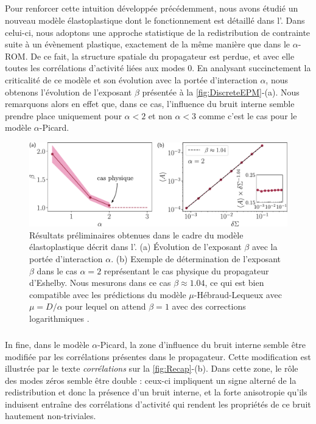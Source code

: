 \subparagraph{}Pour renforcer cette intuition développée précédemment, nous avons étudié un nouveau modèle élastoplastique dont le fonctionnement est détaillé dans l'. Dans celui-ci, nous adoptons une approche statistique de la redistribution de contrainte suite à un évènement plastique, exactement de la même manière que dans le $\alpha$-ROM. De ce fait, la structure spatiale du propagateur est perdue, et avec elle toutes les corrélations d'activité liées aux modes 0. En analysant succinctement la criticalité de ce modèle et son évolution avec la portée d’interaction $\alpha$, nous obtenons l'évolution de l'exposant $\beta$ présentée à la \autoref{fig:DiscreteEPM}-(a). Nous remarquons alors en effet que, dans ce cas, l'influence du bruit interne semble prendre place uniquement pour $\alpha < 2$ et non $\alpha < 3$ comme c'est le cas pour le modèle $\alpha$-Picard.

\begin{figure}[h]
	\centering
	\includegraphics[width=\textwidth]{Chapitre5/Figures/DiscreteEPM.pdf}
	\caption{Résultats préliminaires obtenues dans le cadre du modèle élastoplastique décrit dans l'. (a) Évolution de l'exposant $\beta$ avec la portée d'interaction $\alpha$. (b) Exemple de détermination de l'exposant $\beta$ dans le cas $\alpha = 2$ représentant le cas physique du propagateur d'Eshelby. Nous mesurons dans ce cas $\beta \approx 1.04$, ce qui est bien compatible avec les prédictions du modèle $\mu$-Hébraud-Lequeux avec $\mu = D/\alpha$ pour lequel on attend $\beta = 1$ avec des corrections logarithmiques \cite{lin_microscopic_2018}.}
	\label{fig:DiscreteEPM}
\end{figure}

\subparagraph{}In fine, dans le modèle $\alpha$-Picard, la zone d'influence du bruit interne semble être modifiée par les corrélations présentes dans le propagateur. Cette modification est illustrée par le texte \textit{corrélations} sur la \autoref{fig:Recap}-(b). Dans cette zone, le rôle des modes zéros semble être double : ceux-ci impliquent un signe alterné de la redistribution et donc la présence d'un bruit interne, et la forte anisotropie qu'ils induisent entraîne des corrélations d'activité qui rendent les propriétés de ce bruit hautement non-triviales.

